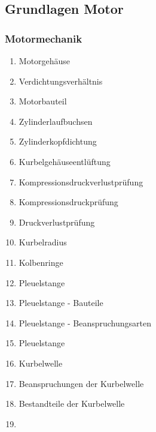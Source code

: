 \subsection{Grundlagen Motor}\label{grundlagen-motor}

\subsubsection{Motormechanik}\label{motormechanik}

\begin{enumerate}
\item
  Motorgehäuse\\
\item
  Verdichtungsverhältnis\\
\item
  Motorbauteil\\
\item
  Zylinderlaufbuchsen\\
\item
  Zylinderkopfdichtung\\
\item
  Kurbelgehäuseentlüftung\\
\item
  Kompressionsdruckverlustprüfung\\
\item
  Kompressionsdruckprüfung\\
\item
  Druckverlustprüfung\\
\item
  Kurbelradius\\
\item
  Kolbenringe\\
\item
  Pleuelstange\\
\item
  Pleuelstange - Bauteile\\
\item
  Pleuelstange - Beanspruchungsarten\\
\item
  Pleuelstange\\
\item
  Kurbelwelle\\
\item
  Beanspruchungen der Kurbelwelle\\
\item
  Bestandteile der Kurbelwelle\\
\item

\end{enumerate}
